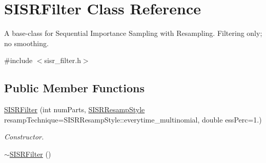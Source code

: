 \hypertarget{classSISRFilter}{}\section{S\+I\+S\+R\+Filter Class Reference}
\label{classSISRFilter}


A base-\/class for Sequential Importance Sampling with Resampling. Filtering only; no smoothing.  




{\ttfamily \#include $<$sisr\+\_\+filter.\+h$>$}

\subsection*{Public Member Functions}
\begin{DoxyCompactItemize}
\item 
\hyperlink{classSISRFilter_a4a629ed5114ed0b3620381ace62af491}{S\+I\+S\+R\+Filter} (int num\+Parts, \hyperlink{sisr__filter_8h_a2486051fd2028dedca520d3e0f8fd92f}{S\+I\+S\+R\+Resamp\+Style} resamp\+Technique=S\+I\+S\+R\+Resamp\+Style\+::everytime\+\_\+multinomial, double ess\+Perc=1.)
\begin{DoxyCompactList}\small\item\em Constructor. \end{DoxyCompactList}\item 
\hyperlink{classSISRFilter_a6953590c7317c8dbf2341640dea71af8}{$\sim$\+S\+I\+S\+R\+Filter} ()\hypertarget{classSISRFilter_a6953590c7317c8dbf2341640dea71af8}{}\label{classSISRFilter_a6953590c7317c8dbf2341640dea71af8}


\end{DoxyCompactItemize}
